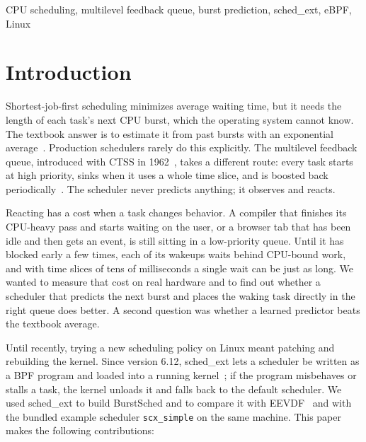 \documentclass[conference]{IEEEtran}
\newcommand{\code}[1]{\texttt{\small #1}}
\begin{document}
\begin{IEEEkeywords}
CPU scheduling, multilevel feedback queue, burst prediction, sched\_ext, eBPF, Linux
\end{IEEEkeywords}

\section{Introduction}

Shortest-job-first scheduling minimizes average waiting time, but it needs the length of each
task's next CPU burst, which the operating system cannot know. The textbook answer is to
estimate it from past bursts with an exponential average~\cite{silberschatz}. Production
schedulers rarely do this explicitly. The multilevel feedback queue, introduced with CTSS in
1962~\cite{corbato}, takes a different route: every task starts at high priority, sinks when it
uses a whole time slice, and is boosted back periodically~\cite{ostep}. The scheduler never
predicts anything; it observes and reacts.

Reacting has a cost when a task changes behavior. A compiler that finishes its CPU-heavy pass
and starts waiting on the user, or a browser tab that has been idle and then gets an event, is
still sitting in a low-priority queue. Until it has blocked early a few times, each of its
wakeups waits behind CPU-bound work, and with time slices of tens of milliseconds a single wait
can be just as long. We wanted to measure that cost on real hardware and to find out whether a
scheduler that predicts the next burst and places the waking task directly in the right queue
does better. A second question was whether a learned predictor beats the textbook average.

Until recently, trying a new scheduling policy on Linux meant patching and rebuilding the
kernel. Since version 6.12, sched\_ext lets a scheduler be written as a BPF program and loaded
into a running kernel~\cite{schedext}; if the program misbehaves or stalls a task, the kernel
unloads it and falls back to the default scheduler. We used sched\_ext to build BurstSched and
to compare it with EEVDF~\cite{eevdf,eevdfdoc} and with the bundled example scheduler
\code{scx\_simple} on the same machine. This paper makes the following contributions:
\end{document}
